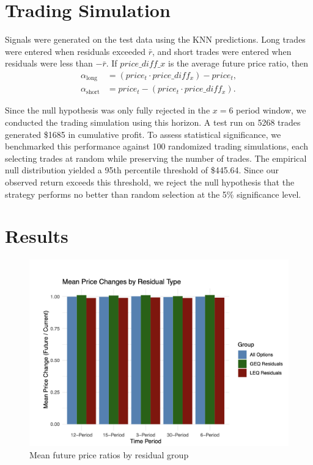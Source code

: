 \documentclass{article}
\begin{document}
\section{Trading Simulation}

Signals were generated on the test data using the KNN predictions. Long trades were entered when residuals exceeded $\bar{r}$, and short trades were entered when residuals were less than $-\bar{r}$. If $price\_diff\_x$ is the average future price ratio, then
\begin{align*}
\alpha_{\text{long}} &= (price_t \cdot price\_diff_x) - price_t,\\
\alpha_{\text{short}} &= price_t - (price_t \cdot price\_diff_x).
\end{align*}

Since the null hypothesis was only fully rejected in the $x = 6$ period window, we conducted the trading simulation using this horizon. A test run on 5268 trades generated \$1685 in cumulative profit. To assess statistical significance, we benchmarked this performance against 100 randomized trading simulations, each selecting trades at random while preserving the number of trades. The empirical null distribution yielded a 95th percentile threshold of \$445.64. Since our observed return exceeds this threshold, we reject the null hypothesis that the strategy performs no better than random selection at the 5\% significance level.

\section{Results}

\begin{figure}[h]
  \centering
  \includegraphics[width=0.8\linewidth]{data/results/mean_price_diff.png}
  \caption{Mean future price ratios by residual group}
  \label{fig:price-diff}
\end{figure}
\end{document}

